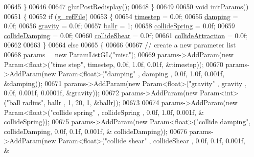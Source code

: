 \begin{DoxyCode}
{{{00645     \}
00646 
00647     glutPostRedisplay();
00648 \}
00649 
\hypertarget{particles_8cpp_source_l00650}{}\hyperlink{particles_8cpp_adf670f569f3be8036b915a6245caf9da}{00650} \textcolor{keywordtype}{void} \hyperlink{particles_8cpp_adf670f569f3be8036b915a6245caf9da}{initParams}()
00651 \{
00652     \textcolor{keywordflow}{if} (\hyperlink{particles_8cpp_ab5af5d243ea25a0fa19984c0f69af840}{g\_refFile})
00653     \{
00654         \hyperlink{particles_8cpp_ab9edcc09985767509bf717e25ac80ab7}{timestep} = 0.0f;
00655         \hyperlink{particles_8cpp_a99d817470e9063f458d39529c7c1724b}{damping} = 0.0f;
00656         \hyperlink{particles_8cpp_a31924e6c9b17aad7f861e818b8be5d8f}{gravity} = 0.0f;
00657         \hyperlink{particles_8cpp_a46d030c711d3073320681aafbb4c490b}{ballr} = 1;
00658         \hyperlink{particles_8cpp_a3d02873abdeffa306da3e5580d94cd0e}{collideSpring} = 0.0f;
00659         \hyperlink{particles_8cpp_adb598dfbf6a6ca7395c9ff264a5312e0}{collideDamping} = 0.0f;
00660         \hyperlink{particles_8cpp_a5bc1804bc03a9aa78be10ae1b3b8f48b}{collideShear} = 0.0f;
00661         \hyperlink{particles_8cpp_a58a3407fb69d0b188eb74b37b078629b}{collideAttraction} = 0.0f;
00662 
00663     \}
00664     \textcolor{keywordflow}{else}
00665     \{
00666 
00667         \textcolor{comment}{// create a new parameter list}
00668         params = \textcolor{keyword}{new} ParamListGL(\textcolor{stringliteral}{"misc"});
00669         params->AddParam(\textcolor{keyword}{new} Param<\textcolor{keywordtype}{float}>(\textcolor{stringliteral}{"time step"}, timestep, 0.0f, 1.0f, 0.01f, &timestep));
00670         params->AddParam(\textcolor{keyword}{new} Param<\textcolor{keywordtype}{float}>(\textcolor{stringliteral}{"damping"}  , damping , 0.0f, 1.0f, 0.001f, &damping));
00671         params->AddParam(\textcolor{keyword}{new} Param<\textcolor{keywordtype}{float}>(\textcolor{stringliteral}{"gravity"}  , gravity , 0.0f, 0.001f, 0.0001f, &gravity));
00672         params->AddParam(\textcolor{keyword}{new} Param<\textcolor{keywordtype}{int}> (\textcolor{stringliteral}{"ball radius"}, ballr , 1, 20, 1, &ballr));
00673 
00674         params->AddParam(\textcolor{keyword}{new} Param<\textcolor{keywordtype}{float}>(\textcolor{stringliteral}{"collide spring"} , collideSpring , 0.0f, 1.0f, 0.001f, &
      collideSpring));
00675         params->AddParam(\textcolor{keyword}{new} Param<\textcolor{keywordtype}{float}>(\textcolor{stringliteral}{"collide damping"}, collideDamping, 0.0f, 0.1f, 0.001f, &
      collideDamping));
00676         params->AddParam(\textcolor{keyword}{new} Param<\textcolor{keywordtype}{float}>(\textcolor{stringliteral}{"collide shear"}  , collideShear  , 0.0f, 0.1f, 0.001f, &
}}}
\end{DoxyCode}

